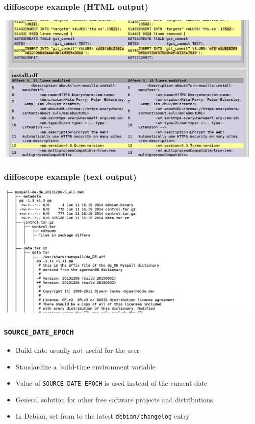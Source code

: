 \documentclass[14pt,aspectratio=169]{beamer}
\begin{document}
\begin{frame}
 \frametitle{diffoscope example (HTML output)}

 \begin{center}
  \includegraphics[width=0.9\paperwidth]{images/diffoscope_example_html.png}
 \end{center}
\end{frame}

\begin{frame}
 \frametitle{diffoscope example (text output)}

 \begin{center}
  \includegraphics[width=0.9\paperwidth]{images/diffoscope_example_text.png}
 \end{center}
\end{frame}

\begin{frame}
 \frametitle{\texttt{SOURCE\_DATE\_EPOCH}}

 \begin{itemize}
  \item Build date usually not useful for the user
  \item Standardize a build-time environment variable
  \item Value of \texttt{SOURCE\_DATE\_EPOCH} is used instead of the current date
  \item General solution for other free software projects and distributions
  \item In Debian, set from to the latest \texttt{debian/changelog} entry
 \end{itemize}
\end{frame}
\end{document}
